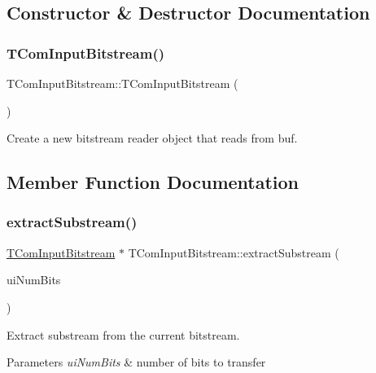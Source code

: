 \subsection{Constructor \& Destructor Documentation}
\mbox{\label{class_t_com_input_bitstream_a1614ece9f93086929270fd9cacbe1fa5}} 
\subsubsection{\texorpdfstring{T\+Com\+Input\+Bitstream()}{TComInputBitstream()}}
{\footnotesize\ttfamily T\+Com\+Input\+Bitstream\+::\+T\+Com\+Input\+Bitstream (\begin{DoxyParamCaption}{ }\end{DoxyParamCaption})}

Create a new bitstream reader object that reads from buf. 

\subsection{Member Function Documentation}
\mbox{\label{class_t_com_input_bitstream_a8d6c02be422f2e8afea9b47b2f92581c}} 
\subsubsection{\texorpdfstring{extract\+Substream()}{extractSubstream()}}
{\footnotesize\ttfamily \hyperlink{class_t_com_input_bitstream}{T\+Com\+Input\+Bitstream} $\ast$ T\+Com\+Input\+Bitstream\+::extract\+Substream (\begin{DoxyParamCaption}\item[{U\+Int}]{ui\+Num\+Bits }\end{DoxyParamCaption})}

Extract substream from the current bitstream.


\begin{DoxyParams}{Parameters}
{\em ui\+Num\+Bits} & number of bits to transfer \\
\hline
\end{DoxyParams}
\mbox{\label{class_t_com_input_bitstream_a641f89e7e0d543aad8bf9aa9180878ae}} 
